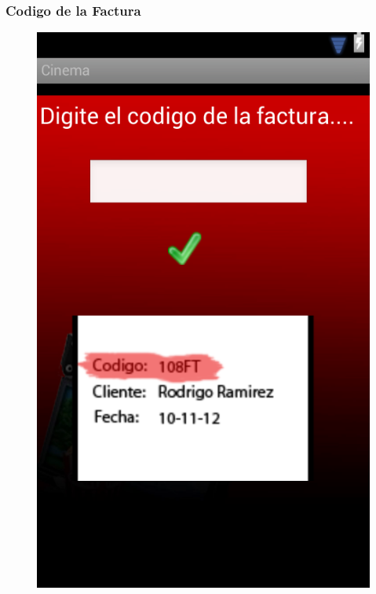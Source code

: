 \documentclass{beamer}
\begin{document}
\begin{frame}[allowframbreaks]
\frametitle{Codigo de la Factura}
\begin{figure}[h]
\centering
\includegraphics[height=0.8\textheight]{codigofactura.png}
\end{figure}
\end{frame}
\end{document}
